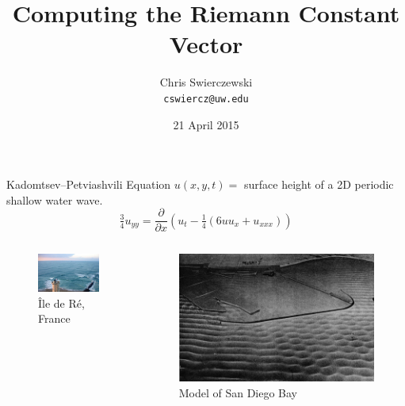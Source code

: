 \documentclass{beamer}
\title{Computing the Riemann Constant Vector}
\author{
  Chris Swierczewski\\
  {\tt cswiercz@uw.edu}
}
\date{21 April 2015}
\institute{
  Department of Applied Mathematics\\
  University of Washington\\
  Seattle, Washington
}
\begin{document}

\begin{frame}
  \titlepage
\end{frame}

\begin{frame}{Kadomtsev--Petviashvili Equation}{}
  $u(x,y,t) = $ surface height of a 2D periodic shallow water wave.
  \[
  \tfrac{3}{4} u_{yy} = \frac{\partial}{\partial x} \left(
  u_t - \tfrac{1}{4} \left(6uu_x + u_{xxx}\right) \right)
  \]

  \begin{columns}[T]
    \begin{column}{0.5\textwidth}
      \begin{figure}
        \centering
        \includegraphics[width=\textwidth]{images/livekp.jpg}
        \caption{\^{I}le de R\'{e}, France}
      \end{figure}
    \end{column}
    \begin{column}{0.5\textwidth}
      \begin{figure}
        \centering
        \includegraphics[width=\textwidth]{images/sd-harbor-model.jpg}
        \caption{Model of San Diego Bay}
      \end{figure}
    \end{column}
  \end{columns}

\end{frame}
\end{document}
